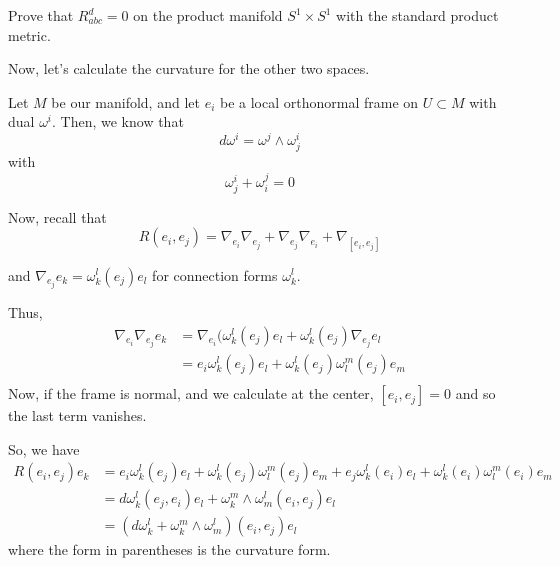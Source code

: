 \documentclass[../main.tex]{subfiles}
\begin{document}
\begin{hw}
    Prove that $R_{abc}^d = 0 $ on the product manifold $S^1\times S^1$ with the
    standard product metric.
\end{hw}

Now, let's calculate the curvature for the other two spaces.

Let $M$ be our manifold, and let $e_i$ be a local orthonormal frame on $U\subset
M$ with dual $\omega^i$. Then, we know that
\begin{equation}
    d\omega^i = \omega^j\wedge\omega_j^i
\end{equation}
with 
\begin{equation}
    \omega^i_j + \omega_i^j = 0
\end{equation}

Now, recall that
\begin{equation}
    R(e_i,e_j) = \nabla_{e_i}\nabla_{e_j} + \nabla_{e_j}\nabla_{e_i} +
\nabla_{[e_i,e_j]}
\end{equation}

and $\nabla_{e_j}e_k = \omega_k^l(e_j)e_l$ for connection forms $\omega_k^l$.

Thus,
\[
    \begin{aligned}
    \nabla_{e_i}\nabla_{e_j}e_k &= \nabla_{e_i}(\omega_k^l(e_j)e_l +
        \omega_k^l(e_j)\nabla_{e_j}e_l\\
        &=e_i \omega_k^l(e_j)e_l + \omega_k^l(e_j)\omega_l^m(e_j)e_m\\
    \end{aligned}
\]
Now, if the frame is normal, and we calculate at the center, $[e_i,e_j] = 0$ and
so the last term vanishes.

So, we have
\[
\begin{aligned}
    R(e_i,e_j)e_k &= 
        e_i \omega_k^l(e_j)e_l + \omega_k^l(e_j)\omega_l^m(e_j)e_m
        + e_j \omega_k^l(e_i)e_l + \omega_k^l(e_i)\omega_l^m(e_i)e_m\\
        &= d\omega_k^l(e_j,e_i)e_l + \omega_k^m\wedge\omega_m^l(e_i,e_j)e_l\\
        &= (d\omega_k^l + \omega_k^m\wedge\omega_m^l)(e_i,e_j)e_l
\end{aligned}
\]
where the form in parentheses is the curvature form.
\end{document}
